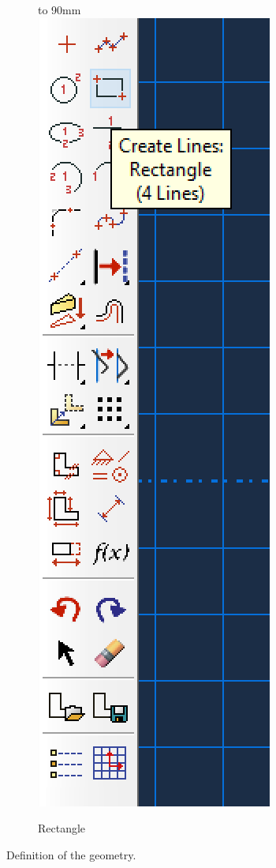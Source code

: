 \documentclass[spanish,a4paper,12pt]{article}
\def\imagebox#1#2{\vtop to #1{\null\hbox{#2}\vfill}}
\begin{document}
\begin{figure}[h!tp]
\begin{subfigure}[b]{0.38\textwidth}
  \end{subfigure}
  \begin{subfigure}[b]{0.25\textwidth}
  \hspace{6mm}
    \imagebox{90mm}{\includegraphics[scale=0.5]{capturas/rectangulo.png}}
    \caption{Rectangle\label{fig:bar1b}}
  \end{subfigure}
\caption{Definition of the geometry.}
\label{fig:bar1}
\end{figure}
\end{document}
